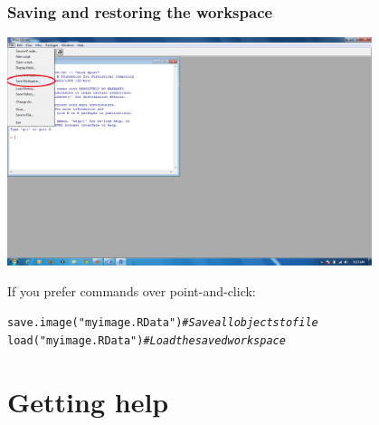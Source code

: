 \documentclass[color=usenames,dvipsnames]{beamer}\usepackage[]{graphicx}\usepackage[]{color}
\makeatletter
\newcommand{\hlstr}[1]{\textcolor[rgb]{0.749,0.012,0.012}{#1}}%
\newcommand{\hlcom}[1]{\textcolor[rgb]{0.514,0.506,0.514}{\textit{#1}}}%
\newcommand{\hlstd}[1]{\textcolor[rgb]{0,0,0}{#1}}%
\newcommand{\hlkwd}[1]{\textcolor[rgb]{0.004,0.004,0.506}{#1}}%
\newenvironment{kframe}{%
 \def\at@end@of@kframe{}%
 \ifinner\ifhmode%
  \def\at@end@of@kframe{\end{minipage}}%
  \begin{minipage}{\columnwidth}%
 \fi\fi%
 \def\FrameCommand##1{\hskip\@totalleftmargin \hskip-\fboxsep
 \colorbox{shadecolor}{##1}\hskip-\fboxsep
     \hskip-\linewidth \hskip-\@totalleftmargin \hskip\columnwidth}%
 \MakeFramed {\advance\hsize-\width
   \@totalleftmargin\z@ \linewidth\hsize
   \@setminipage}}%
 {\par\unskip\endMakeFramed%
 \at@end@of@kframe}
\newenvironment{knitrout}{}{} %
\makeatother
\begin{document}
\begin{frame}[fragile]
  \frametitle{Saving and restoring the workspace}
  \begin{center}
    \includegraphics[width=0.8\textwidth]{figs/save-workspace}
  \end{center}
  \pause
If you prefer commands over point-and-click:
\begin{knitrout}
\color{fgcolor}\begin{kframe}
\begin{alltt}
\hlkwd{save.image}\hlstd{(}\hlstr{"myimage.RData"}\hlstd{)} \hlcom{# Save all objects to file}
\hlkwd{load}\hlstd{(}\hlstr{"myimage.RData"}\hlstd{)}       \hlcom{# Load the saved workspace}
\end{alltt}
\end{kframe}
\end{knitrout}
\end{frame}




\section{Getting help}
\end{document}
